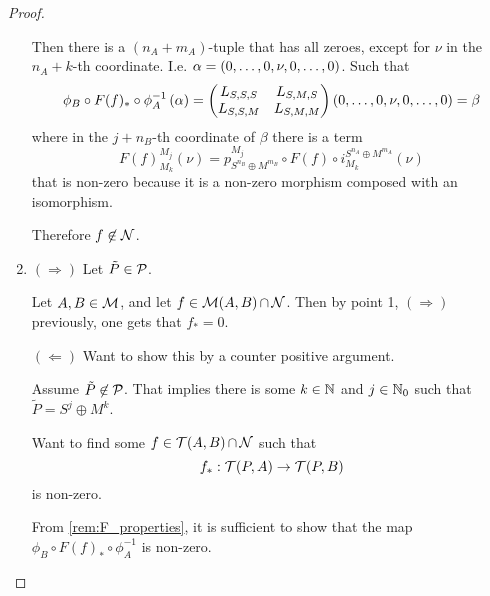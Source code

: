 \begin{proof}
\begin{enumerate}
{\begin{enumerate}
{                    Then there is a \( (n_A + m_A) \)-tuple that has all zeroes, except for \( \nu \) in the \( n_A + k \)-th coordinate. I.e. \( \alpha = \left( 0, \dots, 0, \nu, 0, \dots, 0 \right) \). Such that
                    \[
                        \phi_B \circ F(f)_* \circ \phi_A^{-1} \left( \alpha \right)
                        =
                        \begin{pmatrix}
                            L_{S, S, S} & L_{S, M, S} \\
                            L_{S, S, M} & L_{S, M, M}
                        \end{pmatrix}
                        \left( 0, \dots, 0, \nu, 0, \dots, 0 \right)
                        = \beta
                    \]
                    where in the \( j + n_B \)-th coordinate of \( \beta \) there is a term
                    \[
                        F(f)_{M_k}^{M_j}( \nu ) = p_{S^{n_B} \oplus M^{m_B}}^{M_j} \circ F(f) \circ i_{M_k}^{S^{n_A} \oplus M^{m_A}}( \nu )
                    \]
                    that is non-zero because it is a non-zero morphism composed with an isomorphism.

                    Therefore \( f \not\in {\mathcal{N}} \).
                }
            \end{enumerate} 
        }
        \item {
            \( (\Rightarrow) \) Let \( \tilde{P} \in {\mathcal{P}} \).



            Let \( A, B \in {\mathcal{M}} \), and let \( f \in {\mathcal{M}}(A, B) \mathop{\cap}\limits {\mathcal{N}} \). Then by point 1, \( (\Rightarrow) \) previously, one gets that \( f_* = 0 \).
            
            \( (\Leftarrow) \) Want to show this by a counter positive argument.

            Assume \( \tilde{P} \not\in {\mathcal{P}} \). That implies there is some \( k \in {\mathbb{N}} \) and \( j \in {\mathbb{N}}_0 \) such that \( \tilde{P} = S^j \oplus M^k \).

            Want to find some \( f \in {\mathcal{T}}(A, B) \mathop{\cap}\limits {\mathcal{N}} \) such that
            \[
                f_*: {\mathcal{T}}(P, A) \to {\mathcal{T}}(P, B)
            \]
            is non-zero.

            From \autoref{rem:F_properties}, it is sufficient to show that the map \( \phi_B \circ F(f)_* \circ \phi_A^{-1} \) is non-zero.

}
\end{enumerate}
\end{proof}
